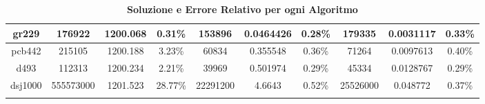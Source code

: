 \begin{longtable}{|c|c|c|c|c|c|c|c|c|c|}
gr229        & 176922             & 1200.068           & 0.31\%          & 153896             & 0.0464426          & 0.28\%          & 179335             & 0.0031117          & 0.33\%          \\ \hline
pcb442       & 215105             & 1200.188           & 3.23\%          & 60834              & 0.355548           & 0.36\%          & 71264              & 0.0097613          & 0.40\%          \\ \hline
d493         & 112313             & 1200.234           & 2.21\%          & 39969              & 0.501974           & 0.29\%          & 45334              & 0.0128767          & 0.29\%          \\ \hline
dsj1000      & 555573000          & 1201.523           & 28.77\%         & 22291200           & 4.6643             & 0.52\%          & 25526000           & 0.048772           & 0.37\%          \\ \hline
\caption{\textbf{Soluzione e Errore Relativo per ogni Algoritmo}}
\end{longtable}
